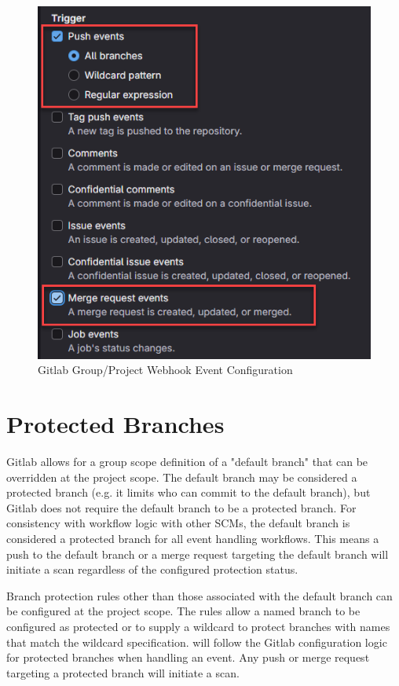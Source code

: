 \begin{figure}[ht]
  \centering
  \includegraphics[width=\textwidth]{graphics/gl-project-hook-2.png}
  \caption{Gitlab Group/Project Webhook Event Configuration}
  \label{fig:gl-project-2}
\end{figure}



\section{Protected Branches}

Gitlab allows for a group scope definition of a "default branch" that can be overridden at the
project scope.  The default branch may be considered a protected branch (e.g. it limits who can
commit to the default branch), but Gitlab does not require the default branch to be a protected
branch.  For consistency with \cxoneflow workflow logic with other SCMs, the default branch is
considered a protected branch for all event handling workflows.  This means a push to the 
default branch or a merge request targeting the default branch will initiate a scan regardless
of the configured protection status.

Branch protection rules other than those associated with the default branch can be configured at
the project scope.  The rules allow a named branch to be configured as protected or to supply
a wildcard to protect branches with names that match the wildcard specification.  \cxoneflow will
follow the Gitlab configuration logic for protected branches when handling an event.  Any push
or merge request targeting a protected branch will initiate a scan.
